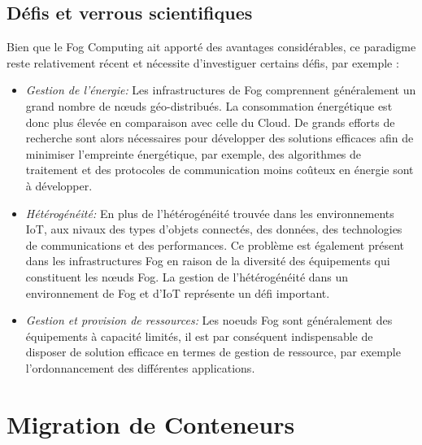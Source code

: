 \subsection{Défis et verrous scientifiques}
Bien que le Fog Computing ait apporté des avantages considérables, ce paradigme reste relativement récent et nécessite  d'investiguer certains défis, par exemple :
\begin{itemize}
  \item \emph{Gestion de l'énergie:} Les infrastructures de Fog comprennent généralement un grand nombre de nœuds géo-distribués. La consommation énergétique est donc plus élevée en comparaison avec celle du Cloud. De grands efforts de recherche sont alors nécessaires pour développer des solutions efficaces afin de minimiser l'empreinte énergétique, par exemple, des algorithmes de traitement et des protocoles de communication moins coûteux en énergie sont à développer.
  \item \emph{Hétérogénéité:} En plus de l'hétérogénéité trouvée dans les environnements IoT, aux nivaux des types d'objets connectés, des données, des technologies de communications et des performances. Ce problème est également présent dans les infrastructures Fog en raison de la diversité des équipements qui constituent les nœuds Fog. La gestion de l'hétérogénéité dans un environnement de Fog et d'IoT représente un défi important.
  \item \emph{Gestion et provision de ressources:} Les noeuds Fog sont généralement des équipements à capacité limités, il est par conséquent indispensable de disposer de solution efficace en termes de gestion de ressource, par exemple l'ordonnancement des différentes applications.
\end{itemize}
\section{Migration de Conteneurs}

